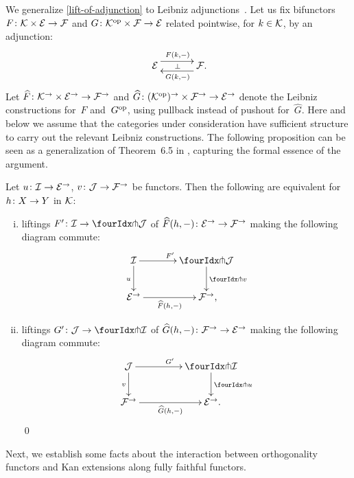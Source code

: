 \documentclass[reqno,10pt,a4paper,oneside,draft]{amsart}
\begin{document}
{{We generalize \cref{lift-of-adjunction} to Leibniz adjunctions~\cite{riehl-verity:reedy}.
Let us fix bifunctors $F \co \cal{K} \times \catE \to \cal{F}$ and $G \co \cal{K}^{\op} \times \cal{F} \to \catE$ related pointwise, for $k \in \cal{K}$, by an adjunction:
\[
\xymatrix@C+1em{
  \catE
  \ar@<5pt>[r]^{F(k, \arghole)}
  \ar@{}[r]|{\bot}
&
  \cal{F}
  \ar@<5pt>[l]^{G(k, \arghole)}
\rlap{.}}
\]
Let $ \widehat{F} \co \cal{K}^\to \times \catE^\to \to \cal{F}^\to$ and $ \widehat{G} \co (\cal{K}^{\op})^\to \times \cal{F}^\to \to \catE^\to$ denote the Leibniz constructions for~$F$ and~$G^{\op}$, using pullback instead of pushout for~$\widehat{G}$.
Here and below we assume that the categories under consideration have sufficient structure to carry out the relevant Leibniz constructions.
The following proposition can be seen as a generalization of Theorem~6.5 in \cite{riehl-monoidal-ams}, capturing the formal essence of the argument.

\begin{proposition} \label{lift-of-leibniz-adjunction}
Let $u \co \cal{I} \to \catE^\to$, $v \co \cal{J} \to \cal{F}^\to$ be functors.
Then the following are equivalent for $h \co X \to Y$ in $\cal{K}$:
\begin{enumerate}[(i)]
\item liftings $F' \co \cal{I} \to \liftl{\cal{J}}$ of $\widehat{F}(h, \arghole) \co \catE^\to \to \cal{F}^\to$ making the following diagram commute:
\[
\xymatrix@C=1.2cm{
  \cal{I}
  \ar[r]^{F'}
  \ar[d]_{u}
&
  \liftl{\cal{J}}
  \ar[d]^{\liftl{v}}
\\
  \catE^\to
  \ar[r]_-{\widehat{F}(h, \arghole)}
&
  \cal{F}^\to
\rlap{,}}
\]
\item liftings $G' \co \cal{J} \to \liftr{\cal{I}}$ of $\widehat{G}(h, \arghole) \co \cal{F}^\to \to \catE^\to$ making the following diagram commute:
\[
\begin{gathered}
\xymatrix@C+2em{
  \cal{J}
  \ar[d]_{v}
  \ar[r]^{G'}
&
  \liftr{\cal{I}}
  \ar[d]^{\liftr{u}}
\\
  \cal{F}^\to
  \ar[r]_-{\widehat{G}(h, \arghole)}
&
  \catE^\to
\rlap{.}}
\end{gathered}
\]
 \qed
\end{enumerate}
\end{proposition}


Next, we establish some facts about the interaction between orthogonality functors and Kan extensions along fully faithful functors.

}}
\end{document}

